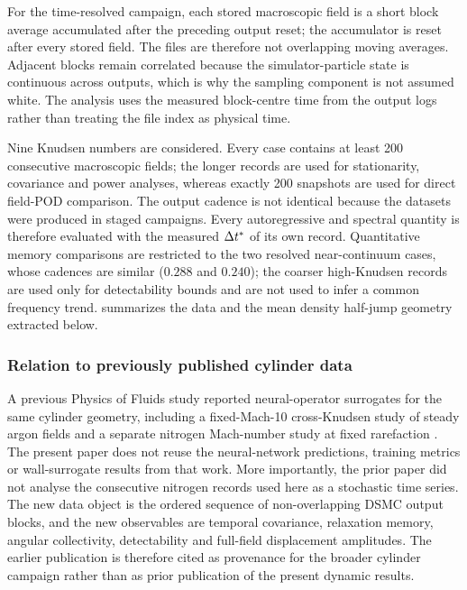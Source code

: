 For the time-resolved campaign, each stored macroscopic field is a short block average accumulated after the preceding output reset; the accumulator is reset after every stored field. The files are therefore not overlapping moving averages. Adjacent blocks remain correlated because the simulator-particle state is continuous across outputs, which is why the sampling component is not assumed white. The analysis uses the measured block-centre time from the output logs rather than treating the file index as physical time.

Nine Knudsen numbers are considered. Every case contains at least 200 consecutive macroscopic fields; the longer records are used for stationarity, covariance and power analyses, whereas exactly 200 snapshots are used for direct field-POD comparison. The output cadence is not identical because the datasets were produced in staged campaigns. Every autoregressive and spectral quantity is therefore evaluated with the measured $\Delta t^*$ of its own record. Quantitative memory comparisons are restricted to the two resolved near-continuum cases, whose cadences are similar ($0.288$ and $0.240$); the coarser high-Knudsen records are used only for detectability bounds and are not used to infer a common frequency trend.  summarizes the data and the mean density half-jump geometry extracted below.

\subsubsection{Relation to previously published cylinder data}
A previous Physics of Fluids study reported neural-operator surrogates for the same cylinder geometry, including a fixed-Mach-10 cross-Knudsen study of steady argon fields and a separate nitrogen Mach-number study at fixed rarefaction \citep{RoohiShojaAzghadi2026PoF}. The present paper does not reuse the neural-network predictions, training metrics or wall-surrogate results from that work. More importantly, the prior paper did not analyse the consecutive nitrogen records used here as a stochastic time series. The new data object is the ordered sequence of non-overlapping DSMC output blocks, and the new observables are temporal covariance, relaxation memory, angular collectivity, detectability and full-field displacement amplitudes. The earlier publication is therefore cited as provenance for the broader cylinder campaign rather than as prior publication of the present dynamic results.

